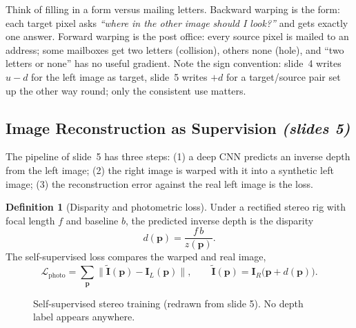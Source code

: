 \documentclass[11pt,a4paper]{article}
\newcommand{\slides}[1]{\texorpdfstring{\emph{(slides #1)}}{(slides #1)}}
\theoremstyle{plain}
\theoremstyle{definition}
\newtheorem{definition}[theorem]{Definition}
\numberwithin{equation}{section}
\begin{document}
\begin{intuition}
Think of filling in a form versus mailing letters. Backward warping is the form: each target pixel asks \emph{``where in the other image should I look?''} and gets exactly one answer. Forward warping is the post office: every source pixel is mailed to an address; some mailboxes get two letters (collision), others none (hole), and ``two letters or none'' has no useful gradient. Note the sign convention: slide~4 writes $u-d$ for the left image as target, slide~5 writes $+d$ for a target/source pair set up the other way round; only the consistent use matters.
\end{intuition}

\subsection{Image Reconstruction as Supervision \slides{5}}
The pipeline of slide~5 has three steps: (1) a deep CNN predicts an inverse depth from the left image; (2) the right image is warped with it into a synthetic left image; (3) the reconstruction error against the real left image is the loss.

\begin{definition}[Disparity and photometric loss]
Under a rectified stereo rig with focal length $f$ and baseline $b$, the predicted inverse depth is the disparity
\begin{equation}
d(\bm p)=\frac{f\,b}{z(\bm p)}.
\end{equation}
The self-supervised loss compares the warped and real image,
\begin{equation}
\mathcal L_{\text{photo}}=\sum_{\bm p}\bigl\|\tilde{\bm I}(\bm p)-\bm I_L(\bm p)\bigr\|,\qquad \tilde{\bm I}(\bm p)=\bm I_R\bigl(\bm p+d(\bm p)\bigr).
\end{equation}
\end{definition}

\begin{figure}[H]
\centering
{}
\caption{Self-supervised stereo training (redrawn from slide 5). No depth label appears anywhere.}
\end{figure}
\end{document}
